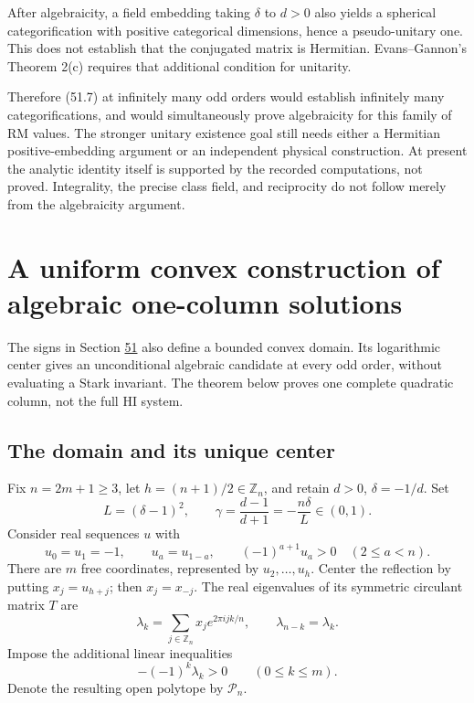 \documentclass[11pt,reqno]{amsart}
\theoremstyle{plain}
\begin{document}
After algebraicity, a field embedding taking \(\delta\) to \(d>0\)
also yields a spherical categorification with positive categorical
dimensions, hence a pseudo-unitary one. This does not establish that
the conjugated matrix is Hermitian. Evans--Gannon's Theorem 2(c)
requires that additional condition for unitarity.

Therefore (51.7) at infinitely many odd orders would establish
infinitely many categorifications, and would simultaneously prove
algebraicity for this family of RM values. The stronger unitary
existence goal still needs either a Hermitian positive-embedding
argument or an independent physical construction. At present the
analytic identity itself is supported by the recorded computations,
not proved. Integrality, the precise class field, and reciprocity do
not follow merely from the algebraicity argument.

\section{A uniform convex construction of algebraic one-column solutions}\label{sec:53}

The signs in Section \hyperref[sec:51]{51} also define a bounded convex domain. Its
logarithmic center gives an unconditional algebraic candidate at every
odd order, without evaluating a Stark invariant. The theorem below
proves one complete quadratic column, not the full HI system.

\subsection{The domain and its unique center}\label{sec:53.1}

Fix \(n=2m+1\ge3\), let \(h=(n+1)/2\in\mathbb Z_n\), and retain
\(d>0\), \(\delta=-1/d\). Set
\begin{equation*}
 L=(\delta-1)^2,\qquad
 \gamma=\frac{d-1}{d+1}=-\frac{n\delta}{L}\in(0,1).
 \tag{53.1}
\end{equation*}
Consider real sequences \(u\) with
\begin{equation*}
 u_0=u_1=-1,\qquad u_a=u_{1-a},\qquad
 (-1)^{a+1}u_a>0\quad(2\le a<n).
 \tag{53.2}
\end{equation*}
There are \(m\) free coordinates, represented by \(u_2,\ldots,u_h\).
Center the reflection by putting \(x_j=u_{h+j}\); then \(x_j=x_{-j}\).
The real eigenvalues of its symmetric circulant matrix \(T\) are
\[
 \lambda_k=\sum_{j\in\mathbb Z_n}x_j e^{2\pi i jk/n},\qquad
 \lambda_{n-k}=\lambda_k.
\]
Impose the additional linear inequalities
\begin{equation*}
 -(-1)^k\lambda_k>0\qquad(0\le k\le m).
 \tag{53.3}
\end{equation*}
Denote the resulting open polytope by \(\mathcal P_n\).
\end{document}
